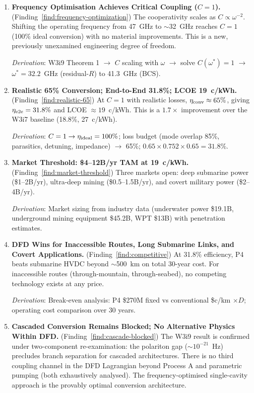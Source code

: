 \documentclass[11pt]{article}
\begin{document}
\begin{enumerate}

\item \textbf{Frequency Optimisation Achieves Critical Coupling ($C = 1$).}
  (Finding~\ref{find:frequency-optimization})
  The cooperativity scales as $C \propto \omega^{-2}$. Shifting the
  operating frequency from 47~GHz to $\sim$32~GHz reaches $C = 1$ (100\%
  ideal conversion) with no material improvements. This is a new,
  previously unexamined engineering degree of freedom.

  \emph{Derivation}: W3i9 Theorem 1 $\to$ $C$ scaling with $\omega$ $\to$
  solve $C(\omega^*) = 1$ $\to$ $\omega^* = 32.2$~GHz (residual-$R$) to
  41.3~GHz (BCS).

\item \textbf{Realistic 65\% Conversion; End-to-End 31.8\%; LCOE 19~c/kWh.}
  (Finding~\ref{find:realistic-65})
  At $C = 1$ with realistic losses, $\eta_{\rm conv} \approx 65\%$,
  giving $\eta_{\rm e2e} = 31.8\%$ and LCOE $\approx 19$~c/kWh. This is
  a $1.7\times$ improvement over the W3i7 baseline (18.8\%, 27~c/kWh).

  \emph{Derivation}: $C = 1 \to \eta_{\rm ideal} = 100\%$; loss budget
  (mode overlap 85\%, parasitics, detuning, impedance) $\to$ 65\%;
  $0.65 \times 0.752 \times 0.65 = 31.8\%$.

\item \textbf{Market Threshold: \$4--12B/yr TAM at 19~c/kWh.}
  (Finding~\ref{find:market-threshold})
  Three markets open: deep submarine power (\$1--2B/yr), ultra-deep mining
  (\$0.5--1.5B/yr), and covert military power (\$2--4B/yr).

  \emph{Derivation}: Market sizing from industry data (underwater power
  \$19.1B, underground mining equipment \$45.2B, WPT \$13B) with
  penetration estimates.

\item \textbf{DFD Wins for Inaccessible Routes, Long Submarine Links,
  and Covert Applications.}
  (Finding~\ref{find:competitive})
  At 31.8\% efficiency, P4 beats submarine HVDC beyond $\sim$500~km on
  total 30-year cost. For inaccessible routes (through-mountain,
  through-seabed), no competing technology exists at any price.

  \emph{Derivation}: Break-even analysis: P4 \$270M fixed vs conventional
  \$c/km $\times D$; operating cost comparison over 30 years.

\item \textbf{Cascaded Conversion Remains Blocked; No Alternative Physics
  Within DFD.}
  (Finding~\ref{find:cascade-blocked})
  The W3i9 result is confirmed under two-component re-examination: the
  polariton gap ($\sim 10^{-21}$~Hz) precludes branch separation for
  cascaded architectures. There is no third coupling channel in the DFD
  Lagrangian beyond Process A and parametric pumping (both exhaustively
  analysed). The frequency-optimised single-cavity approach is the
  provably optimal conversion architecture.


\end{enumerate}
\end{document}
